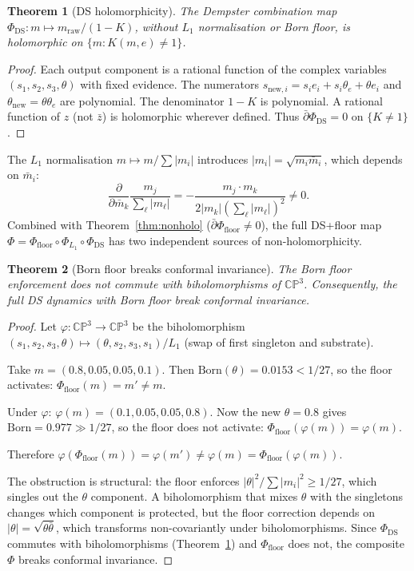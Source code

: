 \documentclass[11pt,a4paper]{article}
\newtheorem{theorem}{Theorem}[section]
\theoremstyle{definition}
\theoremstyle{remark}
\newcommand{\CP}{\mathbb{CP}}
\newcommand{\dbar}{\bar{\partial}}
\begin{document}
\begin{theorem}[DS holomorphicity]\label{thm:ds_holo}
The Dempster combination map $\Phi_{\mathrm{DS}}:m\mapsto m_{\mathrm{raw}}/(1-K)$, without $L_1$ normalisation or Born floor, is holomorphic on $\{m:K(m,e)\neq 1\}$.
\end{theorem}

\begin{proof}
Each output component is a rational function of the complex variables $(s_1,s_2,s_3,\theta)$ with fixed evidence. The numerators $s_{\mathrm{new},i}=s_ie_i+s_i\theta_e+\theta e_i$ and $\theta_{\mathrm{new}}=\theta\theta_e$ are polynomial. The denominator $1-K$ is polynomial. A rational function of $z$ (not $\bar{z}$) is holomorphic wherever defined. Thus $\dbar\Phi_{\mathrm{DS}}=0$ on $\{K\neq 1\}$.
\end{proof}

The $L_1$ normalisation $m\mapsto m/\sum|m_i|$ introduces $|m_i|=\sqrt{m_i\bar{m}_i}$, which depends on $\bar{m}_i$:
\begin{equation}
\frac{\partial}{\partial\bar{m}_k}\frac{m_j}{\sum_\ell|m_\ell|}=-\frac{m_j\cdot m_k}{2|m_k|\left(\sum_\ell|m_\ell|\right)^2}\neq 0.
\end{equation}
Combined with Theorem~\ref{thm:nonholo} ($\dbar\Phi_{\mathrm{floor}}\neq 0$), the full DS+floor map $\Phi=\Phi_{\mathrm{floor}}\circ\Phi_{L_1}\circ\Phi_{\mathrm{DS}}$ has two independent sources of non-holomorphicity.

\begin{theorem}[Born floor breaks conformal invariance]\label{thm:conformal_break}
The Born floor enforcement does not commute with biholomorphisms of $\CP^3$. Consequently, the full DS dynamics with Born floor break conformal invariance.
\end{theorem}

\begin{proof}
Let $\varphi:\CP^3\to\CP^3$ be the biholomorphism $(s_1,s_2,s_3,\theta)\mapsto(\theta,s_2,s_3,s_1)/L_1$ (swap of first singleton and substrate).

Take $m=(0.8,0.05,0.05,0.1)$. Then $\mathrm{Born}(\theta)=0.0153<1/27$, so the floor activates: $\Phi_{\mathrm{floor}}(m)=m'\neq m$.

Under $\varphi$: $\varphi(m)=(0.1,0.05,0.05,0.8)$. Now the new $\theta=0.8$ gives $\mathrm{Born}=0.977\gg 1/27$, so the floor does not activate: $\Phi_{\mathrm{floor}}(\varphi(m))=\varphi(m)$.

Therefore $\varphi(\Phi_{\mathrm{floor}}(m))=\varphi(m')\neq\varphi(m)=\Phi_{\mathrm{floor}}(\varphi(m))$.

The obstruction is structural: the floor enforces $|\theta|^2/\sum|m_i|^2\geq 1/27$, which singles out the $\theta$ component. A biholomorphism that mixes $\theta$ with the singletons changes which component is protected, but the floor correction depends on $|\theta|=\sqrt{\theta\bar\theta}$, which transforms non-covariantly under biholomorphisms. Since $\Phi_{\mathrm{DS}}$ commutes with biholomorphisms (Theorem~\ref{thm:ds_holo}) and $\Phi_{\mathrm{floor}}$ does not, the composite $\Phi$ breaks conformal invariance.
\end{proof}
\end{document}
